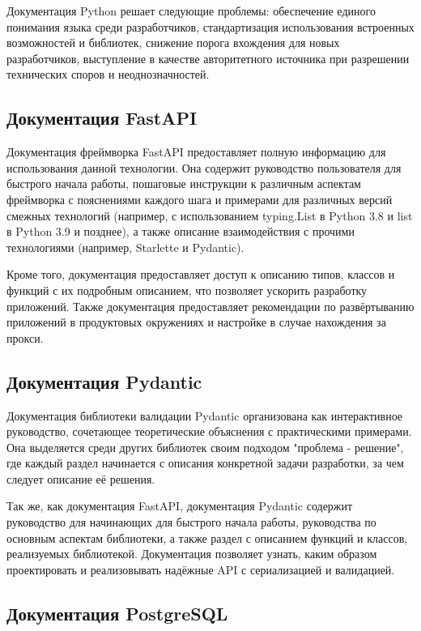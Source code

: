 \documentclass[14pt]{extarticle}
\begin{document}
Документация Python решает следующие проблемы: обеспечение единого понимания языка среди разработчиков, стандартизация использования встроенных возможностей и библиотек, снижение порога вхождения для новых разработчиков, выступление в качестве авторитетного источника при разрешении технических споров и неоднозначностей.



\subsection{Документация FastAPI}

Документация фреймворка FastAPI предоставляет полную информацию для использования данной технологии. Она содержит руководство пользователя для быстрого начала работы, пошаговые инструкции к различным аспектам фреймворка с пояснениями каждого шага и примерами для различных версий смежных технологий (например, с использованием typing.List в Python 3.8 и list в Python 3.9 и позднее), а также описание взаимодействия с прочими технологиями (например, Starlette и Pydantic).

Кроме того, документация предоставляет доступ к описанию типов, классов и функций с их подробным описанием, что позволяет ускорить разработку приложений. Также документация предоставляет рекомендации по развёртыванию приложений в продуктовых окружениях и настройке в случае нахождения за прокси.

\subsection{Документация Pydantic}

Документация библиотеки валидации Pydantic организована как интерактивное руководство, сочетающее теоретические объяснения с практическими примерами. Она выделяется среди других библиотек своим подходом "проблема - решение", где каждый раздел начинается с описания конкретной задачи разработки, за чем следует описание её решения.

Так же, как документация FastAPI, документация Pydantic содержит руководство для начинающих для быстрого начала работы, руководства по основным аспектам библиотеки, а также раздел с описанием функций и классов, реализуемых библиотекой. Документация позволяет узнать, каким образом проектировать и реализовывать надёжные API с сериализацией и валидацией.

\subsection{Документация PostgreSQL}
\end{document}
